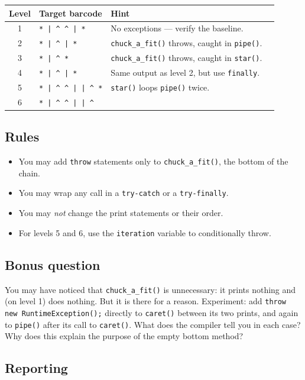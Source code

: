 \documentclass[twoside=false,DIV=14]{scrartcl}
\begin{document}
\begin{tabular}{cp{4cm}lp{5cm}}
\toprule
\textbf{Level} & \textbf{Target barcode} & \textbf{Hint} \\
\midrule
1 & \texttt{* | \^{} \^{} | *} & No exceptions --- verify the baseline. \\
2 & \texttt{* | \^{} | *} & \texttt{chuck\_a\_fit()} throws, caught in \texttt{pipe()}. \\
3 & \texttt{* | \^{} *} & \texttt{chuck\_a\_fit()} throws, caught in \texttt{star()}. \\
4 & \texttt{* | \^{} | *} & Same output as level 2, but use \texttt{finally}. \\
5 & \texttt{* | \^{} \^{} | | \^{} *} & \texttt{star()} loops \texttt{pipe()} twice. \\
6 & \texttt{* | \^{} \^{} | | \^{}} & \\
\bottomrule
\end{tabular}

\subsection*{Rules}
\begin{itemize}
\itemsep0em
\item You may add \texttt{throw} statements only to \texttt{chuck\_a\_fit()}, the bottom of the chain.
\item You may wrap any call in a \texttt{try-catch} or a \texttt{try-finally}.
\item You may \emph{not} change the print statements or their order.
\item For levels 5 and 6, use the \texttt{iteration} variable to conditionally throw.
\end{itemize}

\subsection*{Bonus question}

You may have noticed that \texttt{chuck\_a\_fit()} is unnecessary: it prints nothing and (on level 1) does nothing.  But it is there for a reason.  Experiment: add \texttt{throw new RuntimeException();} directly to \texttt{caret()} between its two prints, and again to \texttt{pipe()} after its call to \texttt{caret()}.  What does the compiler tell you in each case?  Why does this explain the purpose of the empty bottom method?

\subsection*{Reporting}
\end{document}
